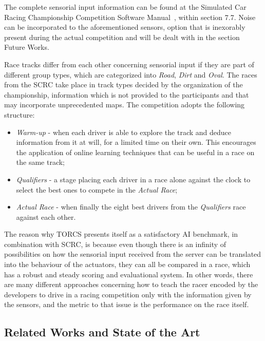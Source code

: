 	The complete sensorial input information can be found at the Simulated Car Racing Championship Competition
	Software Manual~\cite{SCRC}, within section 7.7. Noise can be incorporated to the aforementioned sensors,
	option that is inexorably present during the actual competition and will be dealt with in the section Future
	Works.

	Race tracks differ from each other concerning sensorial input if they are part of different group types, which
	are categorized into \emph{Road}, \emph{Dirt} and \emph{Oval}. The races from the SCRC take place in track types
	decided by the organization of the championship, information which is not provided to the participants and that
	may incorporate unprecedented maps. The competition adopts the following structure:
	
		\begin{itemize}
			
			\item \emph{Warm-up} - when each driver is able to explore the track and deduce information from it	at
			will, for a limited time on their own. This encourages the application of online learning techniques
			that can be useful in a race on the same track;
			
			\item \emph{Qualifiers} - a stage placing each driver in a race alone against the clock to select the best
			ones to compete in the \emph{Actual Race};
			
			\item \emph{Actual Race} - when finally the eight best drivers from the \emph{Qualifiers} race against
			each other.
			
		\end{itemize}
	
	The reason why TORCS presents itself as a satisfactory AI benchmark, in combination with SCRC, is because even
	though there is an infinity of possibilities on how the sensorial input received from the server can be
	translated into the behaviour of the actuators, they can all be compared in a race, which has a robust and steady
	scoring and evaluational system. In other words, there are many different approaches concerning how to teach the
	racer encoded by the developers to drive in a racing competition only with the information given by the sensors,
	and the metric to that issue is the performance on the race itself.

\subsection{Related Works and State of the Art} \label{subsec:Related}
	
